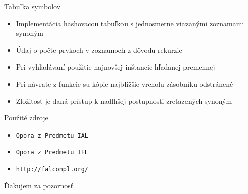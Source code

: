 \documentclass[pdf,slideColor,fyma]{prosper}
\begin{document}
\begin{slide}{Tabuľka symbolov}
\begin{itemize}
\item Implementácia hashovacou tabuľkou s jednosmerne viazanými zoznamami synoným
\item Údaj o počte prvkoch v zoznamoch z dôvodu rekurzie
\item Pri vyhľadávaní použitie najnovšej inštancie hľadanej premennej
\item Pri návrate z funkcie su kópie najbližšie vrcholu zásobníku odstránené

\item Zložitosť je daná prístup k nadlhšej postupnosti zreťazených synoným



\end{itemize}

\end{slide}



\begin{slide}{Použité zdroje}
\begin{itemize}
\item \texttt{Opora z Predmetu IAL}
\item \texttt{Opora z Predmetu IFL}
\item \texttt{http://falconpl.org/}
\end{itemize}
\end{slide}

\begin{slide}{Ďakujem za pozornosť}

\end{slide}
\end{document}
